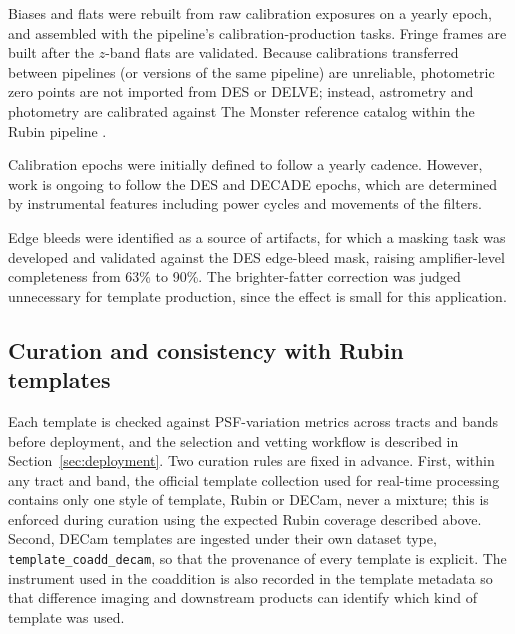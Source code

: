 Biases and flats were rebuilt from raw calibration exposures on a yearly epoch, and assembled with the pipeline's calibration-production tasks. Fringe frames are built after the $z$-band flats are validated. Because calibrations transferred between pipelines (or versions of the same pipeline) are unreliable, photometric zero points are not imported from DES or DELVE; instead, astrometry and photometry are calibrated against The Monster reference catalog within the Rubin pipeline \citep{DMTN-277}.

Calibration epochs were initially defined to follow a yearly cadence. However, work is ongoing to follow the DES and DECADE epochs, which are determined by instrumental features including power cycles and movements of the filters.

Edge bleeds were identified as a source of artifacts, for which a masking task was developed and validated against the DES edge-bleed mask, raising amplifier-level completeness from 63\% to 90\%. The brighter-fatter correction was judged unnecessary for template production, since the effect is small for this application.

\subsection{Curation and consistency with Rubin templates}

Each template is checked against PSF-variation metrics across tracts and bands before deployment, and the selection and vetting workflow is described in Section~\ref{sec:deployment}. Two curation rules are fixed in advance. First, within any tract and band, the official template collection used for real-time processing contains only one style of template, Rubin or DECam, never a mixture; this is enforced during curation using the expected Rubin coverage described above. Second, DECam templates are ingested under their own dataset type, \texttt{template\_coadd\_decam}, so that the provenance of every template is explicit. The instrument used in the coaddition is also recorded in the template metadata so that difference imaging and downstream products can identify which kind of template was used.


